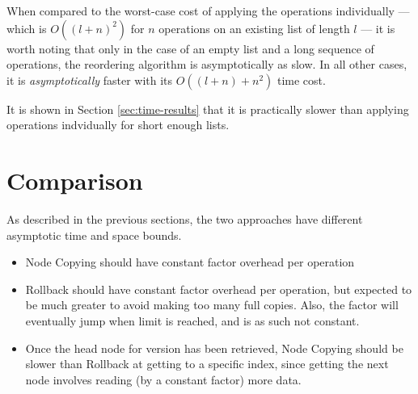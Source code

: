 When compared to the worst-case cost of applying the operations individually ---
which is $O\left(\left(l+n\right)^2\right)$ for $n$ operations on an existing
list of length $l$ --- it is worth noting that only in the case of an empty list
and a long sequence of operations, the reordering algorithm is asymptotically as
slow. In all other cases, it is \emph{asymptotically} faster with its
$O\left((l+n)+n^2\right)$ time cost.

It is shown in Section \ref{sec:time-results} that it is practically slower than
applying operations indvidually for short enough lists.

\section{Comparison}
As described in the previous sections, the two approaches have different
asymptotic time and space bounds.

\begin{itemize}

  \item Node Copying should have constant factor overhead per operation

  \item Rollback should have constant factor overhead per operation, but
  expected to be much greater to avoid making too many full copies. Also, the
  factor will eventually jump when limit is reached, and is as such not
  constant.

  \item Once the head node for version has been retrieved, Node Copying should
  be slower than Rollback at getting to a specific index, since getting the next
  node involves reading (by a constant factor) more data.
\end{itemize}
